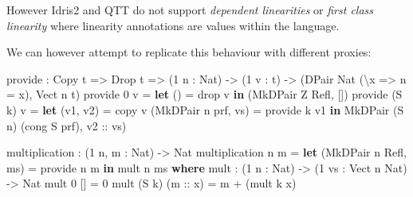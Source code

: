 \documentclass[
]{article}
\newenvironment{Shaded}{}{}
\newcommand{\DataTypeTok}[1]{\textcolor[rgb]{0.56,0.13,0.00}{#1}}
\newcommand{\DecValTok}[1]{\textcolor[rgb]{0.25,0.63,0.44}{#1}}
\newcommand{\FunctionTok}[1]{\textcolor[rgb]{0.02,0.16,0.49}{#1}}
\newcommand{\KeywordTok}[1]{\textcolor[rgb]{0.00,0.44,0.13}{\textbf{#1}}}
\newcommand{\NormalTok}[1]{#1}
\newcommand{\OperatorTok}[1]{\textcolor[rgb]{0.40,0.40,0.40}{#1}}
\newcommand{\OtherTok}[1]{\textcolor[rgb]{0.00,0.44,0.13}{#1}}
\begin{document}
However Idris2 and QTT do not support \emph{dependent linearities} or
\emph{first class linearity} where linearity annotations are values
within the language.

We can however attempt to replicate this behaviour with different
proxies:

\begin{Shaded}
\begin{Highlighting}[]
\NormalTok{provide }\OperatorTok{:} \DataTypeTok{Copy}\NormalTok{ t }\OtherTok{=\textgreater{}} \DataTypeTok{Drop}\NormalTok{ t }\OtherTok{=\textgreater{}}\NormalTok{ (}\DecValTok{1}\NormalTok{ n }\OperatorTok{:} \DataTypeTok{Nat}\NormalTok{) }\OtherTok{{-}\textgreater{}}\NormalTok{ (}\DecValTok{1}\NormalTok{ v }\OperatorTok{:}\NormalTok{ t) }\OtherTok{{-}\textgreater{}}\NormalTok{ (}\DataTypeTok{DPair} \DataTypeTok{Nat}\NormalTok{ (\textbackslash{}x }\OtherTok{=\textgreater{}}\NormalTok{ n }\OtherTok{=}\NormalTok{ x), }\DataTypeTok{Vect}\NormalTok{ n t)}
\NormalTok{provide }\DecValTok{0}\NormalTok{ v }\OtherTok{=} \KeywordTok{let}\NormalTok{ () }\OtherTok{=} \FunctionTok{drop}\NormalTok{ v }\KeywordTok{in}\NormalTok{ (}\DataTypeTok{MkDPair} \DataTypeTok{Z} \DataTypeTok{Refl}\NormalTok{, [])}
\NormalTok{provide (}\DataTypeTok{S}\NormalTok{ k) v }\OtherTok{=} \KeywordTok{let}\NormalTok{ (v1, v2) }\OtherTok{=}\NormalTok{ copy v}
\NormalTok{                      (}\DataTypeTok{MkDPair}\NormalTok{ n prf, vs) }\OtherTok{=}\NormalTok{ provide k v1 }\KeywordTok{in} \DataTypeTok{MkDPair}\NormalTok{ (}\DataTypeTok{S}\NormalTok{ n) (cong }\DataTypeTok{S}\NormalTok{ prf),}\OtherTok{ v2 ::}\NormalTok{ vs)}

\NormalTok{multiplication }\OperatorTok{:}\NormalTok{ (}\DecValTok{1}\NormalTok{ n, m }\OperatorTok{:} \DataTypeTok{Nat}\NormalTok{) }\OtherTok{{-}\textgreater{}} \DataTypeTok{Nat}
\NormalTok{multiplication n m }\OtherTok{=} \KeywordTok{let}\NormalTok{ (}\DataTypeTok{MkDPair}\NormalTok{ n\textquotesingle{} }\DataTypeTok{Refl}\NormalTok{, ms) }\OtherTok{=}\NormalTok{ provide n m }\KeywordTok{in}\NormalTok{ mult n\textquotesingle{} ms}
  \KeywordTok{where}
\NormalTok{    mult }\OperatorTok{:}\NormalTok{ (}\DecValTok{1}\NormalTok{ n }\OperatorTok{:} \DataTypeTok{Nat}\NormalTok{) }\OtherTok{{-}\textgreater{}}\NormalTok{ (}\DecValTok{1}\NormalTok{ vs }\OperatorTok{:} \DataTypeTok{Vect}\NormalTok{ n }\DataTypeTok{Nat}\NormalTok{) }\OtherTok{{-}\textgreater{}} \DataTypeTok{Nat}
\NormalTok{    mult }\DecValTok{0}\NormalTok{ [] }\OtherTok{=} \DecValTok{0}
\NormalTok{    mult (}\DataTypeTok{S}\NormalTok{ k) (}\OtherTok{m ::}\NormalTok{ x) }\OtherTok{=}\NormalTok{ m }\OperatorTok{+}\NormalTok{ (mult k x)}
\end{Highlighting}
\end{Shaded}
\end{document}
